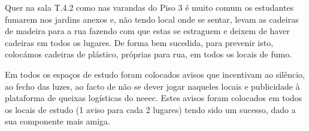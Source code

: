 Quer na sala T.4.2 como nas varandas do Piso 3 é muito comum os estudantes fumarem nos jardins anexos e, não tendo local onde se sentar, levam as cadeiras de madeira para a rua fazendo com que estas se estraguem e deixem de haver cadeiras em todos os lugares. De forma bem sucedida, para prevenir isto, colocámos cadeiras de plástico, próprias para rua, em todos os locais de fumo.

Em todos os espaços de estudo foram colocados avisos que incentivam ao silêncio, ao fecho das luzes, ao facto de não se dever jogar naqueles locais e publicidade à plataforma de queixas logísticas do \acrshort{neeec}. Estes avisos foram colocados em todos os locais de estudo (1 aviso para cada 2 lugares) tendo sido um sucesso, dado a sua componente mais amiga.
